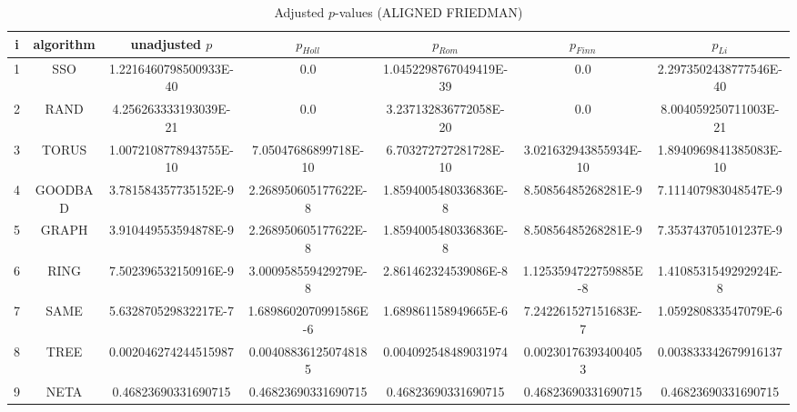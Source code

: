 \documentclass[a4paper,10pt]{article}
\begin{document}
\begin{landscape}
\begin{table}[!htp]
\centering\scriptsize
\caption{Adjusted $p$-values (ALIGNED FRIEDMAN)}
\begin{tabular}{ccccccc}
i&algorithm&unadjusted $p$&$p_{Holl}$&$p_{Rom}$&$p_{Finn}$&$p_{Li}$\\
\hline
1& SSO&1.2216460798500933E-40&0.0&1.0452298767049419E-39&0.0&2.2973502438777546E-40\\
2& RAND&4.256263333193039E-21&0.0&3.237132836772058E-20&0.0&8.004059250711003E-21\\
3& TORUS&1.0072108778943755E-10&7.05047686899718E-10&6.703272727281728E-10&3.021632943855934E-10&1.8940969841385083E-10\\
4& GOODBAD&3.781584357735152E-9&2.268950605177622E-8&1.8594005480336836E-8&8.50856485268281E-9&7.111407983048547E-9\\
5& GRAPH&3.910449553594878E-9&2.268950605177622E-8&1.8594005480336836E-8&8.50856485268281E-9&7.353743705101237E-9\\
6& RING&7.502396532150916E-9&3.000958559429279E-8&2.861462324539086E-8&1.1253594722759885E-8&1.4108531549292924E-8\\
7& SAME&5.632870529832217E-7&1.6898602070991586E-6&1.689861158949665E-6&7.242261527151683E-7&1.059280833547079E-6\\
8& TREE&0.002046274244515987&0.004088361250748185&0.004092548489031974&0.002301763934004053&0.003833342679916137\\
9& NETA&0.46823690331690715&0.46823690331690715&0.46823690331690715&0.46823690331690715&0.46823690331690715\\
\hline
\end{tabular}
\end{table}


\newpage


\end{landscape}
\end{document}

